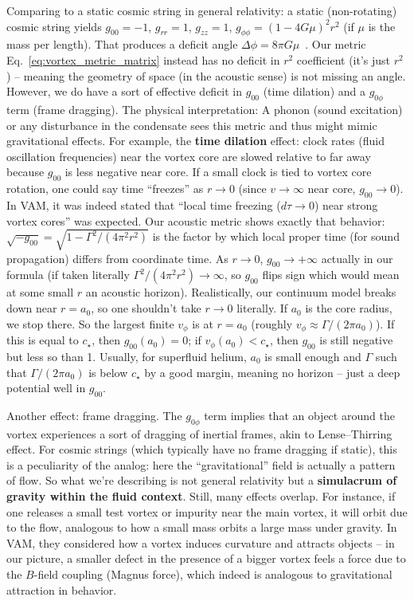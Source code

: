 \documentclass[12pt]{article}
\begin{document}
Comparing to a static cosmic string in general relativity: a static (non-rotating) cosmic string yields $g_{00}=-1$, $g_{rr}=1$, $g_{zz}=1$, $g_{\phi\phi} = (1-4G\mu)^2 r^2$ (if $\mu$ is the mass per length). That produces a deficit angle $\Delta \phi = 8\pi G \mu$~\cite{ref:vilenkin}. Our metric Eq.~\eqref{eq:vortex_metric_matrix} instead has no deficit in $r^2$ coefficient (it’s just $r^2$) -- meaning the geometry of space (in the acoustic sense) is not missing an angle. However, we do have a sort of effective deficit in $g_{00}$ (time dilation) and a $g_{0\phi}$ term (frame dragging). The physical interpretation: A phonon (sound excitation) or any disturbance in the condensate sees this metric and thus might mimic gravitational effects. For example, the \textbf{time dilation} effect: clock rates (fluid oscillation frequencies) near the vortex core are slowed relative to far away because $g_{00}$ is less negative near core. If a small clock is tied to vortex core rotation, one could say time ``freezes'' as $r\to 0$ (since $v\to \infty$ near core, $g_{00}\to 0$). In VAM, it was indeed stated that ``local time freezing ($d\tau \to 0$) near strong vortex cores'' was expected. Our acoustic metric shows exactly that behavior: $\sqrt{-g_{00}} = \sqrt{1 - \Gamma^2/(4\pi^2 r^2)}$ is the factor by which local proper time (for sound propagation) differs from coordinate time. As $r\to 0$, $g_{00}\to +\infty$ actually in our formula (if taken literally $\Gamma^2/(4\pi^2r^2)\to\infty$, so $g_{00}$ flips sign which would mean at some small $r$ an acoustic horizon). Realistically, our continuum model breaks down near $r=a_0$, so one shouldn’t take $r\to 0$ literally. If $a_0$ is the core radius, we stop there. So the largest finite $v_\phi$ is at $r = a_0$ (roughly $v_\phi \approx \Gamma/(2\pi a_0)$). If this is equal to $c_\star$, then $g_{00}(a_0)=0$; if $v_\phi(a_0)<c_\star$, then $g_{00}$ is still negative but less so than 1. Usually, for superfluid helium, $a_0$ is small enough and $\Gamma$ such that $\Gamma/(2\pi a_0)$ is below $c_\star$ by a good margin, meaning no horizon -- just a deep potential well in $g_{00}$.

Another effect: frame dragging. The $g_{0\phi}$ term implies that an object around the vortex experiences a sort of dragging of inertial frames, akin to Lense--Thirring effect. For cosmic strings (which typically have no frame dragging if static), this is a peculiarity of the analog: here the ``gravitational'' field is actually a pattern of flow. So what we’re describing is not general relativity but a \textbf{simulacrum of gravity within the fluid context}. Still, many effects overlap. For instance, if one releases a small test vortex or impurity near the main vortex, it will orbit due to the flow, analogous to how a small mass orbits a large mass under gravity. In VAM, they considered how a vortex induces curvature and attracts objects -- in our picture, a smaller defect in the presence of a bigger vortex feels a force due to the $B$-field coupling (Magnus force), which indeed is analogous to gravitational attraction in behavior.
\end{document}
